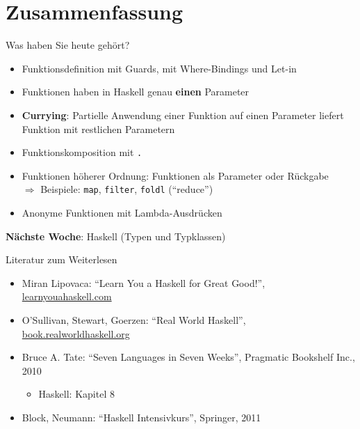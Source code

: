 \documentclass[svgnames,smaller,ngerman]{beamer}
\newcommand{\blueArrow}{{\color{midnightblue}$\pmb{\Rightarrow}$}\xspace}
\begin{document}
\section{Zusammenfassung}

\begin{frame}[fragile]{Was haben Sie heute gehört?}
    \begin{itemize}
        \item Funktionsdefinition mit Guards, mit Where-Bindings und Let-in
        \item Funktionen haben in Haskell genau \textbf{einen} Parameter
        \item \textbf{Currying}: Partielle Anwendung einer Funktion auf einen
              Parameter liefert Funktion mit restlichen Parametern
        \item Funktionskomposition mit \verb/./
        \item Funktionen höherer Ordnung: Funktionen als Parameter oder
              Rückgabe\\
              \blueArrow Beispiele: \verb/map/, \verb/filter/, \verb/foldl/
              (\enquote{reduce})
        \item Anonyme Funktionen mit Lambda-Ausdrücken
    \end{itemize}

    \vfill

    \textbf{Nächste Woche}: Haskell (Typen und Typklassen)
\end{frame}


\begin{frame}{Literatur zum Weiterlesen}
    \begin{itemize}
        \item Miran Lipovaca: \enquote{Learn You a Haskell for Great Good!},
              \href{http://learnyouahaskell.com}{learnyouahaskell.com}
        \item O’Sullivan, Stewart, Goerzen: \enquote{Real World Haskell},
              \href{http://book.realworldhaskell.org}{book.realworldhaskell.org}
        \item Bruce A. Tate: \enquote{Seven Languages in Seven Weeks},
              Pragmatic Bookshelf Inc., 2010
              \begin{itemize}
                  \item Haskell: Kapitel 8
              \end{itemize}
        \item Block, Neumann: \enquote{Haskell Intensivkurs}, Springer, 2011
    \end{itemize}
\end{frame}
\end{document}
